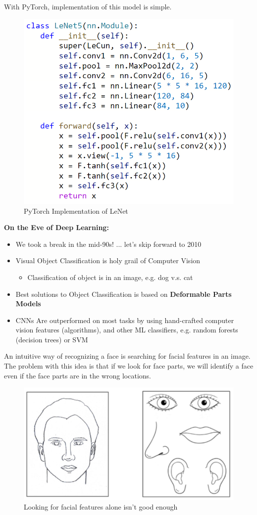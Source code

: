With PyTorch, implementation of this model is simple. 

\begin{figure}[h!t]
    \centering
    \includegraphics[width=0.5\linewidth]{lenetpy.png}
    \caption{PyTorch Implementation of LeNet}
    \label{fig:enter-label}
\end{figure}

\newpage

\textbf{On the Eve of Deep Learning:}
\begin{itemize}
    \item We took a break in the mid-90s! ... let's skip forward to 2010
    \item Visual Object Classification is holy grail of Computer Vision
    \begin{itemize}
        \item Classification of object is in an image, e.g. dog v.s. cat
    \end{itemize}
    \item Best solutions to Object Classification is based on \textbf{Deformable Parts Models}
    \item CNNs Are outperformed on most tasks by using hand-crafted computer vision features (algorithms), and other ML classifiers, e.g. random forests (decision trees) or SVM
\end{itemize}

An intuitive way of recognizing a face is searching for facial features in an image. The problem with this idea is that if we look for face parts, we will identify a face even if the face parts are in the wrong locations.

\begin{figure}[h!t]
    \centering
    \includegraphics[width=0.35\linewidth]{deformablepartsmodel.png}
    \caption{Looking for facial features alone isn't good enough}
    \label{fig:enter-label}
\end{figure}

